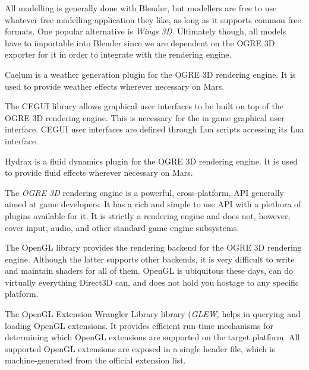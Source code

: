 \startitemize[3]
\setupwhitespace[big]

All modelling is generally done with Blender, but modellers are free to use whatever free modelling application they like, as long as it supports common free formats. One popular alternative is {\it Wings 3D}. Ultimately though, all models have to importable into Blender since we are dependent on the OGRE 3D exporter for it in order to integrate with the rendering engine.


Caelum is a weather generation plugin for the OGRE 3D rendering engine. It is used to provide weather effects wherever necessary on Mars.


The CEGUI library allows graphical user interfaces to be built on top of the OGRE 3D rendering engine. This is necessary for the in game graphical user interface. CEGUI user interfaces are defined through Lua scripts accessing its Lua interface.


Hydrax is a fluid dynamics plugin for the OGRE 3D rendering engine. It is used to provide fluid effects wherever necessary on Mars.


The {\it OGRE 3D} rendering engine is a powerful, cross-platform, API generally aimed at game developers. It has a rich and simple to use API with a plethora of plugins available for it. It is strictly a rendering engine and does not, however, cover input, audio, and other standard game engine subsystems.


The OpenGL library provides the rendering backend for the OGRE 3D rendering engine. Although the latter supports other backends, it is very difficult to write and maintain shaders for all of them. OpenGL is ubiquitous these days, can do virtually everything Direct3D can, and does not hold you hostage to any specific platform.


The OpenGL Extension Wrangler Library library ({\it GLEW}, helps in querying and loading OpenGL extensions. It provides efficient run-time mechanisms for determining which OpenGL extensions are supported on the target platform. All supported OpenGL extensions are exposed in a single header file, which is machine-generated from the official extension list.

